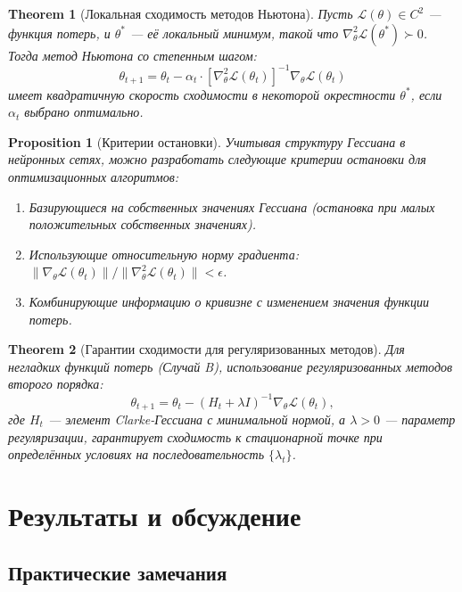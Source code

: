 \documentclass[11pt]{article}
\newtheorem{theorem}{Theorem}
\newtheorem{proposition}{Proposition}
\begin{document}
\begin{theorem}[Локальная сходимость методов Ньютона]
  Пусть $\mathcal{L}(\theta) \in C^2$ — функция потерь, и $\theta^*$ — её локальный минимум, такой что
  $\nabla^2_\theta \mathcal{L}(\theta^*) \succ 0$. Тогда метод Ньютона со степенным шагом:
  \[
    \theta_{t+1} = \theta_t - \alpha_t \cdot [\nabla^2_\theta \mathcal{L}(\theta_t)]^{-1} \nabla_\theta
    \mathcal{L}(\theta_t)
  \]
  имеет квадратичную скорость сходимости в некоторой окрестности $\theta^*$, если $\alpha_t$ выбрано оптимально.
\end{theorem}

\begin{proposition}[Критерии остановки]
  Учитывая структуру Гессиана в нейронных сетях, можно разработать следующие критерии остановки для
  оптимизационных алгоритмов:
  \begin{enumerate}
    \item Базирующиеся на собственных значениях Гессиана (остановка при малых положительных собственных значениях).
    \item Использующие относительную норму градиента: $\|\nabla_\theta \mathcal{L}(\theta_t)\| /
      \|\nabla^2_\theta \mathcal{L}(\theta_t)\| < \epsilon$.
    \item Комбинирующие информацию о кривизне с изменением значения функции потерь.
  \end{enumerate}
\end{proposition}

\begin{theorem}[Гарантии сходимости для регуляризованных методов]
  Для негладких функций потерь (Случай B), использование регуляризованных методов второго порядка:
  \[
    \theta_{t+1} = \theta_t - (H_t + \lambda I)^{-1} \nabla_\theta \mathcal{L}(\theta_t),
  \]
  где $H_t$ — элемент Clarke-Гессиана с минимальной нормой, а $\lambda > 0$ — параметр регуляризации,
  гарантирует сходимость к стационарной точке при определённых условиях на последовательность $\{\lambda_t\}$.
\end{theorem}

\section{Результаты и обсуждение}

\subsection{Практические замечания}
\end{document}
